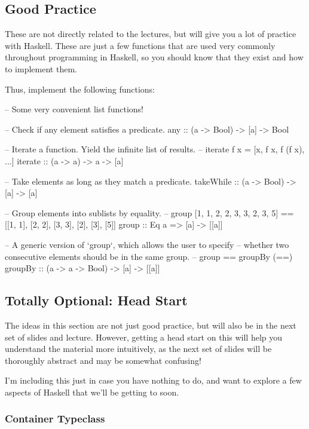 \documentclass{article}
\begin{document}
\subsection*{Good Practice}
These are not directly related to the lectures, but will give you a lot of practice with Haskell.
These are just a few functions that are used very commonly throughout programming in Haskell, so you
should know that they exist and how to implement them.

Thus, implement the following functions:
\begin{haskellcode}
-- Some very convenient list functions!

-- Check if any element satisfies a predicate.
any :: (a -> Bool) -> [a] -> Bool

-- Iterate a function. Yield the infinite list of results.
-- iterate f x = [x, f x, f (f x), ...]
iterate :: (a -> a) -> a  -> [a]

-- Take elements as long as they match a predicate.
takeWhile :: (a -> Bool) -> [a] -> [a]

-- Group elements into sublists by equality.
-- group [1, 1, 2, 2, 3, 3, 2, 3, 5] == [[1, 1], [2, 2], [3, 3], [2], [3], [5]]
group :: Eq a => [a] -> [[a]]

-- A generic version of `group`, which allows the user to specify 
-- whether two consecutive elements should be in the same group.
-- group == groupBy (==)
groupBy :: (a -> a -> Bool) -> [a] -> [[a]]
\end{haskellcode}


\subsection*{Totally Optional: Head Start}
The ideas in this section are not just good practice, but will also be in the next set of slides and
lecture. However, getting a head start on this will help you understand the material more
intuitively, as the next set of slides will be thoroughly abstract and may be somewhat confusing!

I'm including this just in case you have nothing to do, and want to explore a few aspects of Haskell
that we'll be getting to soon.

\subsubsection*{Container Typeclass}
\end{document}
